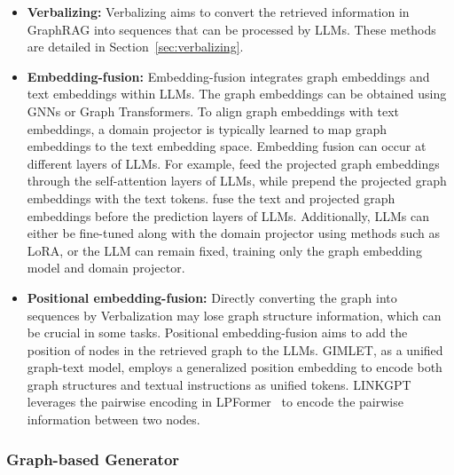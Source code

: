 \begin{itemize}[leftmargin=*]
    \item \textbf{Verbalizing:} Verbalizing aims to convert the retrieved information in GraphRAG into sequences that can be processed by LLMs. These methods are detailed in Section~\ref{sec:verbalizing}. 

    \item \textbf{Embedding-fusion:} Embedding-fusion integrates graph embeddings and text embeddings within LLMs. The graph embeddings can be obtained using GNNs or Graph Transformers\cite{chai2023graphllm}. To align graph embeddings with text embeddings, a domain projector is typically learned to map graph embeddings to the text embedding space. Embedding fusion can occur at different layers of LLMs. For example, \citet{he2024g} feed the projected graph embeddings through the self-attention layers of LLMs, while \citet{tian2024graph} prepend the projected graph embeddings with the text tokens. \cite{argatu2024joint} fuse the text and projected graph embeddings before the prediction layers of LLMs.
    Additionally, LLMs can either be fine-tuned along with the domain projector using methods such as LoRA, or the LLM can remain fixed, training only the graph embedding model and domain projector.

    \item \textbf{Positional embedding-fusion:} Directly converting the graph into sequences by Verbalization may lose graph structure information, which can be crucial in some tasks. Positional embedding-fusion aims to add the position of nodes in the retrieved graph to the LLMs. GIMLET\cite{zhao2023gimlet}, as a unified graph-text model, employs a generalized position embedding to encode both graph structures and textual instructions as unified tokens. LINKGPT~\cite{he2024linkgpt} leverages the pairwise encoding in LPFormer~\cite{shomer2024lpformer} to encode the pairwise information between two nodes.
\end{itemize}





\subsubsection{Graph-based Generator}

